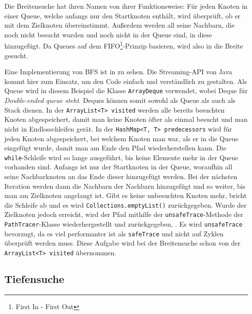             Die Breitensuche hat ihren Namen von ihrer Funktionsweise: Für jeden Knoten in einer Queue, welche anfangs nur den Startknoten enthält, wird überprüft, ob er mit dem Zielknoten übereinstimmt. Außerdem werden all seine Nachbarn, die noch nicht besucht wurden und noch nicht in der Queue sind, in diese hinzugefügt. Da Queues auf dem FIFO\footnote{First In - First Out}-Prinzip basieren, wird also in die Breite gesucht.
            
            Eine Implementierung von BFS ist in  zu sehen. Die Streaming-API von Java kommt hier zum Einsatz, um den Code einfach und verständlich zu gestalten. Als Queue wird in diesem Beispiel die Klasse \lstinline{ArrayDeque} verwendet, wobei Deque für \emph{Double-ended queue steht}. Deques können somit sowohl als Queue als auch als Stack dienen. In der \lstinline{ArrayList<T> visited} werden alle bereits besuchten Knoten abgespeichert, damit man keine Knoten öfter als einmal besucht und man nicht in Endlosschleifen gerät. In der \lstinline{HashMap<T, T> predecessors} wird für jeden Knoten abgespeichert, bei welchem Knoten man war, als er in die Queue eingefügt wurde, damit man am Ende den Pfad wiederherstellen kann. Die \lstinline{while}-Schleife wird so lange ausgeführt, bis keine Elemente mehr in der Queue vorhanden sind. Anfangs ist nur der Startknoten in der Queue, woraufhin all seine Nachbarknoten an das Ende dieser hinzugefügt werden. Bei der nächsten Iteration werden dann die Nachbarn der Nachbarn hinzugefügt und so weiter, bis man am Zielknoten angelangt ist. Gibt es keine unbesuchten Knoten mehr, bricht die Schleife ab und es wird \lstinline{Collections.emptyList()} zurückgegeben. Wurde der Zielknoten jedoch erreicht, wird der Pfad mithilfe der \lstinline{unsafeTrace}-Methode der \lstinline{PathTracer}-Klasse wiederhergestellt und zurückgegeben, . Es wird \lstinline{unsafeTrace} bevorzugt, da es viel performanter ist als \lstinline{safeTrace} und nicht auf Zyklen überprüft werden muss. Diese Aufgabe wird bei der Breitensuche schon von der \lstinline{ArrayList<T> visited} übernommen.
            
            

        \subsection{Tiefensuche}

